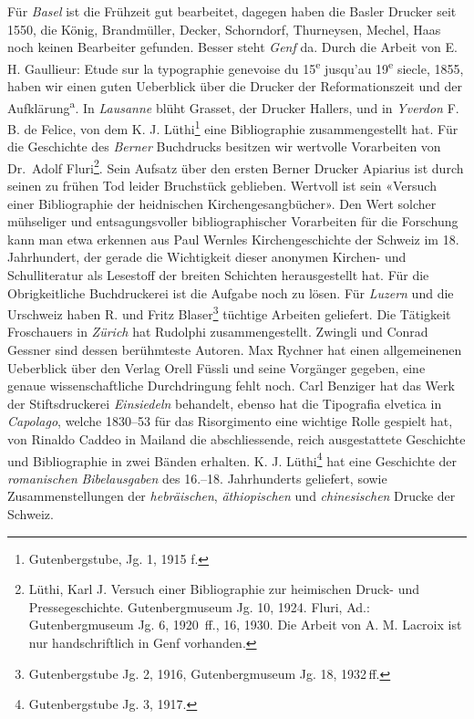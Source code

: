 \documentclass[a4paper,
fontsize=11pt,
oneside,
numbers=noperiodatend,
parskip=half-,
bibliography=totoc,
final
]{scrartcl}
\begin{document}
Für \emph{Basel} ist die Frühzeit gut bearbeitet, dagegen haben die
Basler Drucker seit 1550, die König, Brandmüller, Decker, Schorndorf,
Thurneysen, Mechel, Haas noch keinen Bearbeiter gefunden. Besser steht
\emph{Genf} da. Durch die Arbeit von E. H. Gaullieur: Etude sur la
typographie genevoise du 15\textsuperscript{e} jusqu'au
19\textsuperscript{e} siecle, 1855, haben wir einen guten Ueberblick
über die Drucker der Reformationszeit und der Aufklärung\footnotemark[15]\textsuperscript{a}. In
\emph{Lausanne} blüht Grasset, der Drucker Hallers, und in
\emph{Yverdon} F. B. de Felice, von dem K. J. Lüthi\footnote{Gutenbergstube,
  Jg. 1, 1915 f.} eine Bibliographie zusammengestellt hat. Für die
Geschichte des \emph{Berner} Buchdrucks besitzen wir wertvolle
Vorarbeiten von Dr.~Adolf Fluri\footnote{Lüthi, Karl J. Versuch einer
  Bibliographie zur heimischen Druck- und Pressegeschichte.
  Gutenbergmuseum Jg. 10, 1924. Fluri, Ad.: Gutenbergmuseum Jg. 6, 1920
 \,ff., 16, 1930. Die Arbeit von A. M. Lacroix ist nur handschriftlich in
  Genf vorhanden.}. Sein Aufsatz über den ersten Berner Drucker Apiarius
ist durch seinen zu frühen Tod leider Bruchstück geblieben. Wertvoll ist
sein «Versuch einer Bibliographie der heidnischen Kirchengesangbücher».
Den Wert solcher mühseliger und entsagungsvoller bibliographischer
Vorarbeiten für die Forschung kann man etwa erkennen aus Paul Wernles
Kirchengeschichte der Schweiz im 18. Jahrhundert, der gerade die
Wichtigkeit dieser anonymen Kirchen- und Schulliteratur als Lesestoff
der breiten Schichten herausgestellt hat. Für die Obrigkeitliche
Buchdruckerei ist die Aufgabe noch zu lösen. Für \emph{Luzern} und die
Urschweiz haben R. und Fritz Blaser\footnote{Gutenbergstube Jg. 2, 1916,
  Gutenbergmuseum Jg. 18, 1932\,ff.} tüchtige Arbeiten geliefert. Die
Tätigkeit Froschauers in \emph{Zürich} hat Rudolphi zusammengestellt.
Zwingli und Conrad Gessner sind dessen berühmteste Autoren. Max Rychner
hat einen allgemeinenen Ueberblick über den Verlag Orell Füssli und
seine Vorgänger gegeben, eine genaue wissenschaftliche Durchdringung
fehlt noch. Carl Benziger hat das Werk der Stiftsdruckerei
\emph{Einsiedeln} behandelt, ebenso hat die Tipografia elvetica in
\emph{Capolago}, welche 1830--53 für das Risorgimento eine wichtige
Rolle gespielt hat, von Rinaldo Caddeo in Mailand die abschliessende,
reich ausgestattete Geschichte und Bibliographie in zwei Bänden
erhalten. K. J. Lüthi\footnote{Gutenbergstube Jg. 3, 1917.} hat eine
Geschichte der \emph{romanischen} \emph{Bibelausgaben} des 16.--18.
Jahrhunderts geliefert, sowie Zusammenstellungen der \emph{hebräischen},
\emph{äthiopischen} und \emph{chinesischen} Drucke der Schweiz.
\end{document}
